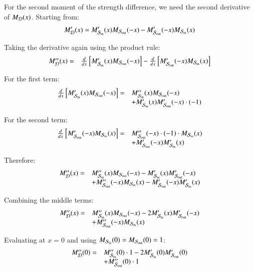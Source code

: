 \documentclass[a4paper,pre,superscriptaddress,floatfix,nofootinbib,twocolumn]{revtex4-1}
\begin{document}
For the second moment of the strength difference, we need the second derivative of $M_{\cal D}(x)$. Starting from:
\[
M'_{\cal D}(x) = M'_{{\cal S}_\text{in}}(x) M_{{\cal S}_\text{out}}(-x) - M'_{{\cal S}_\text{out}}(-x) M_{{\cal S}_\text{in}}(x)
\]

Taking the derivative again using the product rule:
\[
\begin{array}{ll}
M''_{\cal D}(x) = & \frac{d}{dx}\left[M'_{{\cal S}_\text{in}}(x) M_{{\cal S}_\text{out}}(-x)\right] - \frac{d}{dx}\left[M'_{{\cal S}_\text{out}}(-x) M_{{\cal S}_\text{in}}(x)\right]
\end{array}
\]

For the first term:
\[
\begin{array}{ll}
\frac{d}{dx}\left[M'_{{\cal S}_\text{in}}(x) M_{{\cal S}_\text{out}}(-x)\right] = & M''_{{\cal S}_\text{in}}(x) M_{{\cal S}_\text{out}}(-x) \\
& + M'_{{\cal S}_\text{in}}(x) M'_{{\cal S}_\text{out}}(-x) \cdot (-1)
\end{array}
\]

For the second term:
\[
\begin{array}{ll}
\frac{d}{dx}\left[M'_{{\cal S}_\text{out}}(-x) M_{{\cal S}_\text{in}}(x)\right] = & M''_{{\cal S}_\text{out}}(-x) \cdot (-1) \cdot M_{{\cal S}_\text{in}}(x) \\
& + M'_{{\cal S}_\text{out}}(-x) M'_{{\cal S}_\text{in}}(x)
\end{array}
\]

Therefore:
\[
\begin{array}{ll}
M''_{\cal D}(x) = & M''_{{\cal S}_\text{in}}(x) M_{{\cal S}_\text{out}}(-x) - M'_{{\cal S}_\text{in}}(x) M'_{{\cal S}_\text{out}}(-x) \\
& + M''_{{\cal S}_\text{out}}(-x) M_{{\cal S}_\text{in}}(x) - M'_{{\cal S}_\text{out}}(-x) M'_{{\cal S}_\text{in}}(x)
\end{array}
\]

Combining the middle terms:
\[
\begin{array}{ll}
M''_{\cal D}(x) = & M''_{{\cal S}_\text{in}}(x) M_{{\cal S}_\text{out}}(-x) - 2 M'_{{\cal S}_\text{in}}(x) M'_{{\cal S}_\text{out}}(-x) \\
& + M''_{{\cal S}_\text{out}}(-x) M_{{\cal S}_\text{in}}(x)
\end{array}
\]

Evaluating at $x = 0$ and using $M_{{\cal S}_\text{in}}(0) = M_{{\cal S}_\text{out}}(0) = 1$:
\[
\begin{array}{ll}
M''_{\cal D}(0) = & M''_{{\cal S}_\text{in}}(0) \cdot 1 - 2 M'_{{\cal S}_\text{in}}(0) M'_{{\cal S}_\text{out}}(0) \\
& + M''_{{\cal S}_\text{out}}(0) \cdot 1
\end{array}
\]
\end{document}
